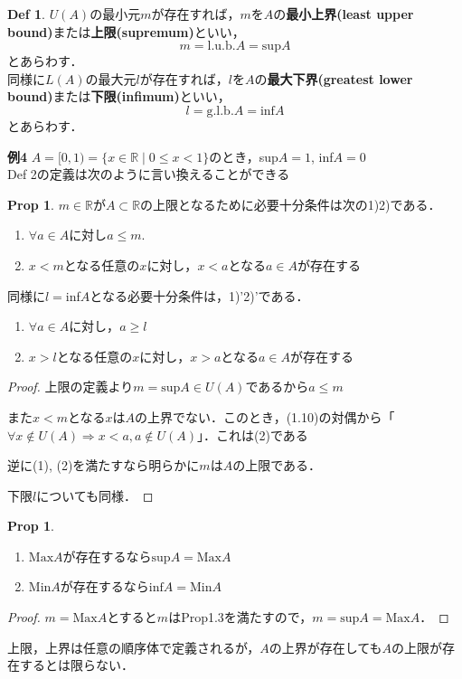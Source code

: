 \documentclass{ltjsarticle}
\theoremstyle{definition}
\newtheorem{definition}{Def}[subsection]
\newtheorem{prop}[thm]{Prop}
\theoremstyle{propcorollarystyle}
\newtheorem{propcor}[thm]{Prop}
\theoremstyle{thmcorollarystyle}
\begin{document}
\begin{definition}
  $U(A)$の最小元$m$が存在すれば，$m$を$A$の\textbf{最小上界(least upper bound)}または\textbf{上限(supremum)}といい，\\
  \[
  m=\text{l.u.b.}A=\text{sup}A
  \]
  とあらわす．\\
  同様に$L(A)$の最大元$l$が存在すれば，$l$を$A$の\textbf{最大下界(greatest lower bound)}または\textbf{下限(infimum)}といい，\\
  \[
  l=\text{g.l.b.}A=\text{inf}A
  \]
  とあらわす．
\end{definition}

\textbf{例4} $A=[0,1)=\{x \in \mathbb{R} \mid 0 \le x <1\}$のとき，sup$A=1$, inf$A=0$\\

Def 2の定義は次のように言い換えることができる\\
\begin{prop}
  $m \in \mathbb{R}$が$A \subset \mathbb{R}$の上限となるために必要十分条件は次の1)2)である．
  \begin{enumerate}[label={\arabic*)}, itemsep=1em]
    \item $\forall a \in A$に対し$a \le m$.
    \item $x <m$となる任意の$x$に対し，$x<a$となる$a \in A$が存在する
  \end{enumerate}
  同様に$l=$inf$A$となる必要十分条件は，1)'2)'である．
  \begin{enumerate}[label={\arabic*)'}, itemsep=1em]
    \item $\forall a \in A$に対し，$a \ge l$
    \item $x>l$となる任意の$x$に対し，$x>a$となる$a \in A$が存在する
  \end{enumerate}
\end{prop}
\begin{proof}
  上限の定義より$m=\text{sup}A \in U(A)$であるから$a \le m$\par
  また$x < m$となる$x$は$A$の上界でない．このとき，(1.10)の対偶から「$\forall x \notin U(A) \Rightarrow x < a, a \notin U(A)$」．これは(2)である\par
  逆に(1), (2)を満たすなら明らかに$m$は$A$の上限である．\par
  下限$l$についても同様．
\end{proof}

\addtocounter{thm}{-1}
\begin{propcor}
  \begin{enumerate}[label={\arabic*)}, itemsep=1em]
    \item $\text{Max}A$が存在するなら$\text{sup}A=\text{Max}A$
    \item $\text{Min}A$が存在するなら$\text{inf}A=\text{Min}A$
  \end{enumerate}
\end{propcor}
\begin{proof}
  $m=\text{Max}A$とすると$m$はProp1.3を満たすので，$m=\text{sup}A=\text{Max}A$．
\end{proof}
上限，上界は任意の順序体で定義されるが，$A$の上界が存在しても$A$の上限が存在するとは限らない．
\end{document}
